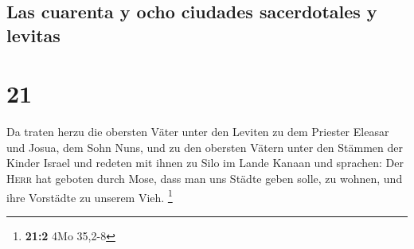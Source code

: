 \hypertarget{las-cuarenta-y-ocho-ciudades-sacerdotales-y-levitas}{%
\subsection{Las cuarenta y ocho ciudades sacerdotales y
levitas}\label{las-cuarenta-y-ocho-ciudades-sacerdotales-y-levitas}}

\hypertarget{section-20}{%
\section{21}\label{section-20}}

 Da traten herzu die obersten Väter unter den Leviten zu
dem Priester Eleasar und Josua, dem Sohn Nuns, und zu den obersten
Vätern unter den Stämmen der Kinder Israel  und redeten
mit ihnen zu Silo im Lande Kanaan und sprachen: Der \textsc{Herr} hat
geboten durch Mose, dass man uns Städte geben solle, zu wohnen, und ihre
Vorstädte zu unserem Vieh. \footnote{\textbf{21:2} 4Mo 35,2-8}

